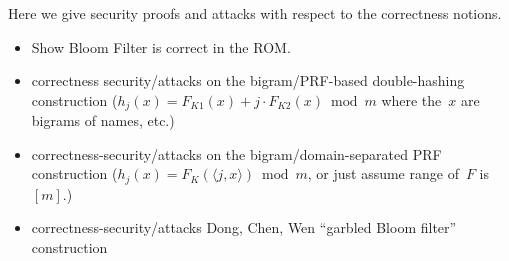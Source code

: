   Here we give security proofs and attacks with respect to the correctness notions.
\begin{itemize}
\item Show Bloom Filter is correct in the ROM. 
\item correctness security/attacks on the bigram/PRF-based double-hashing construction ($h_j(x) = F_{K1}(x) + j\cdot F_{K2}(x) \bmod m$ where the~$x$ are bigrams of names, etc.)
\item correctness-security/attacks on the bigram/domain-separated PRF construction ($h_j(x)=F_K(\langle j,x \rangle) \bmod m$, or just assume range of~$F$ is $[m]$.) 
\item correctness-security/attacks Dong, Chen, Wen ``garbled Bloom filter'' construction

\end{itemize}

